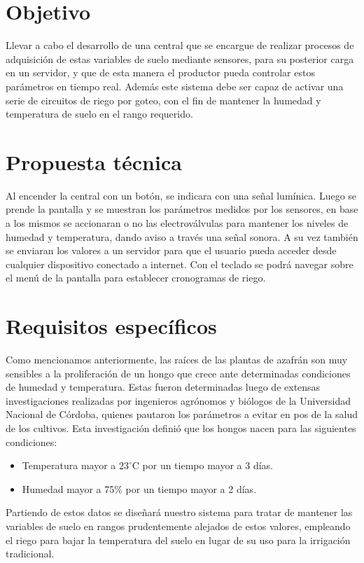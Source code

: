 \documentclass{article}
\begin{document}
\section{Objetivo}
Llevar a cabo el desarrollo de una central que se encargue de realizar procesos de adquisición de estas variables de suelo mediante sensores, para su posterior carga en un servidor, y que de esta manera el productor pueda controlar estos parámetros en tiempo real. Además este sistema debe ser capaz de activar una serie de circuitos de riego por goteo, con el fin de mantener la humedad y temperatura de suelo en el rango requerido.

\section{Propuesta técnica}

Al encender la central con un botón, se indicara con una señal lumínica. Luego se prende la pantalla y se muestran los parámetros medidos por los sensores, en base a los mismos se accionaran o no las electroválvulas para mantener los niveles de humedad y temperatura, dando aviso a través una señal sonora. A su vez también se enviaran los valores a un servidor para que el usuario pueda acceder desde cualquier dispositivo conectado a internet.
Con el teclado se podrá navegar sobre el menú de la pantalla para establecer cronogramas de riego.


\section{Requisitos específicos}
Como mencionamos anteriormente, las raíces de las plantas de azafrán son muy sensibles a la proliferación de un hongo que crece ante determinadas condiciones de humedad y temperatura. Estas fueron determinadas luego de extensas investigaciones realizadas por ingenieros agrónomos y biólogos de la Universidad Nacional de Córdoba, quienes pautaron los parámetros a evitar en pos de la salud de los cultivos.
Esta investigación definió que los hongos nacen para las siguientes condiciones:


\begin{itemize}
    \item Temperatura mayor a $23^\circ$C por un tiempo mayor a 3 días.
    \item Humedad mayor a 75\% por un tiempo mayor a 2 días.
\end{itemize}

Partiendo de estos datos se diseñará nuestro sistema para tratar de mantener las variables de suelo en rangos prudentemente alejados de estos valores, empleando el riego para bajar la temperatura del suelo en lugar de su uso para la irrigación tradicional.
\end{document}
